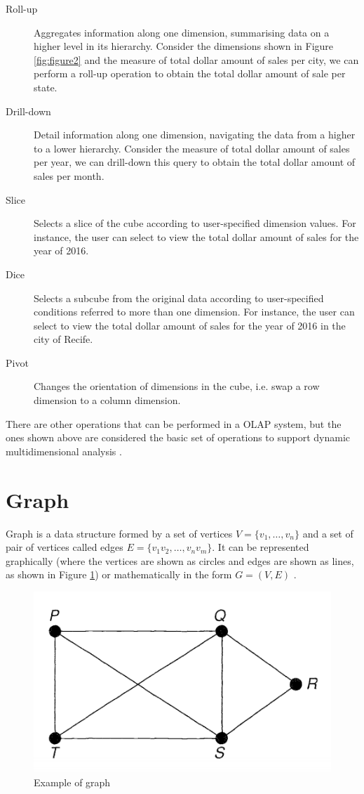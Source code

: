 \begin{description}
\item[Roll-up] Aggregates information along one dimension, summarising data on a higher level in its hierarchy. Consider the dimensions shown in Figure \ref{fig:figure2} and the measure of total dollar amount of sales per city, we can perform a roll-up operation to obtain the total dollar amount of sale per state.
\item[Drill-down] Detail information along one dimension, navigating the data from a higher to a lower hierarchy. Consider the measure of total dollar amount of sales per year, we can drill-down this query to obtain the total dollar amount of sales per month.
\item[Slice] Selects a slice of the cube according to user-specified dimension values. For instance, the user can select to view the total dollar amount of sales for the year of 2016.
\item[Dice] Selects a subcube from the original data according to user-specified conditions referred to more than one dimension. For instance, the user can select to view the total dollar amount of sales for the year of 2016 in the city of Recife.
\item[Pivot] Changes the orientation of dimensions in the cube, i.e. swap a row dimension to a column dimension.
\end{description}

There are other operations that can be performed in a OLAP system, but the ones shown above are considered the basic set of operations to support dynamic multidimensional analysis \cite{Inmon2005}.

\section{Graph}
Graph is a data structure formed by a set of vertices $V = \{v_1, \dots, v_n\}$  and a set of pair of vertices called edges $E = \{v_1v_2, \dots, v_nv_m\}$. It can be represented graphically (where the vertices are shown as circles and edges are shown as lines, as shown in Figure \ref{fig:figure4}) or mathematically in the form $G = (V, E)$ \cite{Tobergte2013}.

\begin{figure}[ht]
\centering
\includegraphics[width=.4\textwidth]{../graph_example.png}
\caption{Example of graph \cite{Tobergte2013}}
\label{fig:figure4}
\end{figure}

